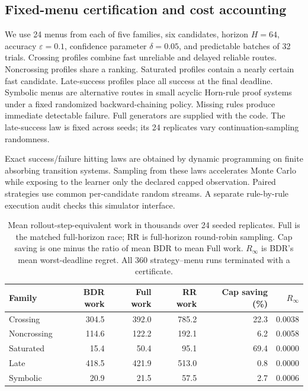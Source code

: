 \documentclass[11pt]{article}
\theoremstyle{definition}\newtheorem{definition}[theorem]{Definition}
\newcommand{\eps}{\varepsilon}
\begin{document}
\subsection{Fixed-menu certification and cost accounting}
We use 24 menus from each of five families, six candidates, horizon $H=64$, accuracy $\eps=0.1$, confidence parameter $\delta=0.05$, and predictable batches of 32 trials. Crossing profiles combine fast unreliable and delayed reliable routes. Noncrossing profiles share a ranking. Saturated profiles contain a nearly certain fast candidate. Late-success profiles place all success at the final deadline. Symbolic menus are alternative routes in small acyclic Horn-rule proof systems under a fixed randomized backward-chaining policy. Missing rules produce immediate detectable failure. Full generators are supplied with the code. The late-success law is fixed across seeds; its 24 replicates vary continuation-sampling randomness.

Exact success/failure hitting laws are obtained by dynamic programming on finite absorbing transition systems. Sampling from these laws accelerates Monte Carlo while exposing to the learner only the declared capped observation. Paired strategies use common per-candidate random streams. A separate rule-by-rule execution audit checks this simulator interface.

\begin{table}[t]
\centering\small
\begin{tabular}{lrrrrr}
\toprule
Family & BDR work & Full work & RR work & Cap saving (\%) & $R_\infty$ \\
\midrule
Crossing & 304.5 & 392.0 & 785.2 & 22.3 & 0.0038 \\
Noncrossing & 114.6 & 122.2 & 192.1 & 6.2 & 0.0058 \\
Saturated & 15.4 & 50.4 & 95.1 & 69.4 & 0.0000 \\
Late & 418.5 & 421.9 & 513.0 & 0.8 & 0.0000 \\
Symbolic & 20.9 & 21.5 & 57.5 & 2.7 & 0.0006 \\
\bottomrule
\end{tabular}
\caption{Mean rollout-step-equivalent work in thousands over 24 seeded replicates. Full is the matched full-horizon race; RR is full-horizon round-robin sampling. Cap saving is one minus the ratio of mean BDR to mean Full work. $R_\infty$ is BDR's mean worst-deadline regret. All 360 strategy--menu runs terminated with a certificate.}
\label{tab:cost}
\end{table}
\end{document}
